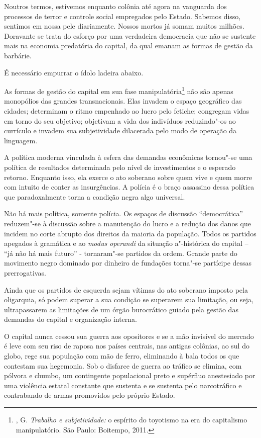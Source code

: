 Noutros termos, estivemos enquanto colônia até agora na vanguarda dos
processos de terror e controle social empregados pelo Estado. Sabemos
disso, sentimos em nossa pele diariamente. Nossos mortos já somam muitos
milhões. Doravante se trata do esforço por uma verdadeira democracia que
não se sustente mais na economia predatória do capital, da qual emanam
as formas de gestão da barbárie.

É necessário empurrar o ídolo ladeira abaixo.

As formas de gestão do capital em sua fase manipulatória\footnote{,
  G. \emph{Trabalho e subjetividade:} o espírito do toyotismo na era do
  capitalismo manipulatório. São Paulo: Boitempo, 2011.} não são apenas
monopólios das grandes transnacionais. Elas invadem o espaço geográfico
das cidades; determinam o ritmo empenhado ao lucro pelo fetiche;
congregam vidas em torno do seu objetivo; objetivam a vida dos
indivíduos reduzindo"-os ao currículo e invadem sua subjetividade
dilacerada pelo modo de operação da linguagem.

A política moderna vinculada à esfera das demandas econômicas tornou"-se
uma política de resultados determinada pelo nível de investimentos e o
esperado retorno. Enquanto isso, ela exerce o ato soberano sobre quem
vive e quem morre com intuito de conter as insurgências. A polícia é o
braço assassino dessa política que paradoxalmente torna a condição negra
algo universal.

Não há mais política, somente polícia. Os espaços de discussão
``democrática'' reduzem"-se à discussão sobre a manutenção do lucro e a
redução dos danos que incidem no corte abrupto dos direitos da maioria
da população. Todos os partidos apegados à gramática e ao \emph{modus
operandi} da situação a"-histórica do capital -- ``já não há mais futuro''
- tornaram"-se partidos da ordem. Grande parte do movimento negro
dominado por dinheiro de fundações torna"-se partícipe dessas
prerrogativas.

Ainda que os partidos de esquerda sejam vítimas do ato soberano imposto
pela oligarquia, só podem superar a sua condição se superarem sua
limitação, ou seja, ultrapassarem as limitações de um órgão burocrático
guiado pela gestão das demandas do capital e organização interna.

O capital nunca cessou sua guerra aos opositores e se a mão invisível do
mercado é leve com seu riso de raposa nos países centrais, nas antigas
colônias, ao sul do globo, rege sua população com mão de ferro,
eliminando à bala todos os que contestam sua hegemonia. Sob o disfarce
de guerra ao tráfico se elimina, com pólvora e chumbo, um contingente
populacional preto e supérfluo anestesiado por uma violência estatal
constante que sustenta e se sustenta pelo narcotráfico e contrabando de
armas promovidos pelo próprio Estado.

